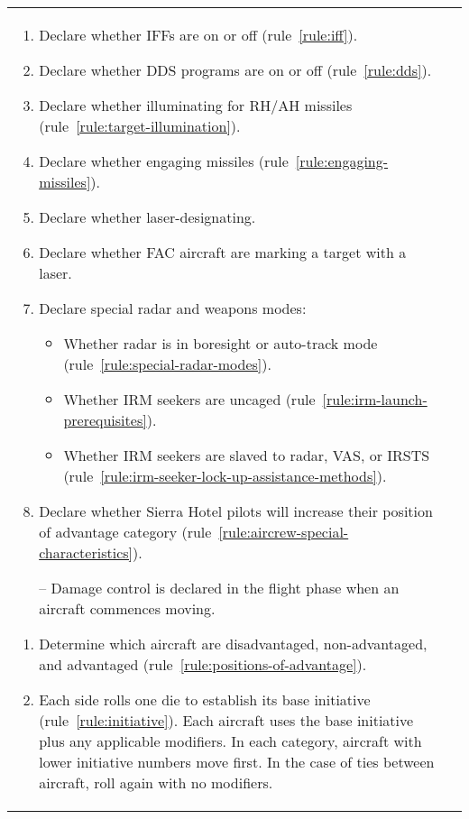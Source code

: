 \begin{twocolumntable}
\begin{tabularx}{1.0\linewidth}{L@{\hspace{\columnsep}}L}
{\begin{enumerate}
\begin{enumerate}[nosep]
    \item Declare whether IFFs are on or off (rule~\ref{rule:iff}).
    \item Declare whether DDS programs are on or off (rule~\ref{rule:dds}).
    \item Declare whether illuminating for RH/AH missiles (rule~\ref{rule:target-illumination}).
    \item Declare whether engaging missiles (rule~\ref{rule:engaging-missiles}).
    \item Declare whether laser-designating.
    \item Declare whether FAC aircraft are marking a target with a laser.
    \item Declare special radar and weapons modes:
    \begin{itemize}
        \item Whether radar is in boresight or auto-track mode (rule~\ref{rule:special-radar-modes}).
        \item Whether IRM seekers are uncaged (rule~\ref{rule:irm-launch-prerequisites}).
        \item Whether IRM seekers are slaved to radar, VAS, or IRSTS (rule~\ref{rule:irm-seeker-lock-up-assistance-methods}).
    \end{itemize}
    \item Declare whether Sierra Hotel pilots will increase their position of advantage category (rule~\ref{rule:aircrew-special-characteristics}).
    \item[--] Damage control is declared in the flight phase when an aircraft commences moving.
\end{enumerate}


\begin{enumerate}[nosep]
    \item Determine which aircraft are disadvantaged, non-advantaged, and advantaged (rule~\ref{rule:positions-of-advantage}).
    \item Each side rolls one die to establish its base initiative (rule~\ref{rule:initiative}). Each aircraft uses the base initiative plus any applicable modifiers. In each category, aircraft with lower initiative numbers move first. In the case of ties between aircraft, roll again with no modifiers.
\end{enumerate}

\end{enumerate}

}
\end{tabularx}
\end{twocolumntable}
